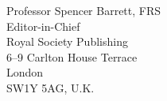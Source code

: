 \documentclass[10pt, a4paper]{letter} %
\begin{document}
\begin{letter}{
Professor Spencer Barrett, FRS\\
Editor-in-Chief\\
Royal Society Publishing\\
6--9 Carlton House Terrace\\
London\\
SW1Y 5AG, U.K.\\
}


\end{letter}
\end{document}

